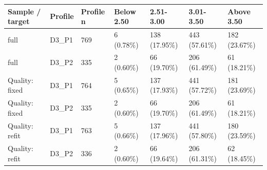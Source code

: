 \begin{tabular}{lllllll}
\toprule
Sample / target & Profile & Profile n & Below 2.50 & 2.51-3.00 & 3.01-3.50 & Above 3.50 \\
\midrule
full & D3\_P1 & 769 & 6 (0.78\%) & 138 (17.95\%) & 443 (57.61\%) & 182 (23.67\%) \\
full & D3\_P2 & 335 & 2 (0.60\%) & 66 (19.70\%) & 206 (61.49\%) & 61 (18.21\%) \\
Quality: fixed & D3\_P1 & 764 & 5 (0.65\%) & 137 (17.93\%) & 441 (57.72\%) & 181 (23.69\%) \\
Quality: fixed & D3\_P2 & 335 & 2 (0.60\%) & 66 (19.70\%) & 206 (61.49\%) & 61 (18.21\%) \\
Quality: refit & D3\_P1 & 763 & 5 (0.66\%) & 137 (17.96\%) & 441 (57.80\%) & 180 (23.59\%) \\
Quality: refit & D3\_P2 & 336 & 2 (0.60\%) & 66 (19.64\%) & 206 (61.31\%) & 62 (18.45\%) \\
\bottomrule
\end{tabular}
